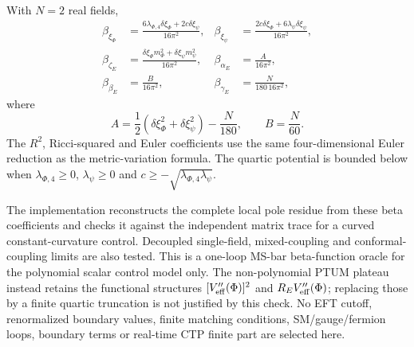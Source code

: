 \documentclass[epj]{svjour}
\begin{document}
With $N=2$ real fields,
\begin{align}
\beta_{\xi_\Phi}
&=\frac{6\lambda_{\Phi,4}\delta\xi_\Phi
+2c\delta\xi_\psi}{16\pi^2},
&
\beta_{\xi_\psi}
&=\frac{2c\delta\xi_\Phi
+6\lambda_\psi\delta\xi_\psi}{16\pi^2},
\nonumber\\
\beta_{\zeta_E}
&=\frac{\delta\xi_\Phi m_\Phi^2
+\delta\xi_\psi m_\psi^2}{16\pi^2},
&
\beta_{\alpha_E}
&=\frac{A}{16\pi^2},
\nonumber\\
\beta_{\beta_E}
&=\frac{B}{16\pi^2},
&
\beta_{\gamma_E}
&=\frac{N}{180\,16\pi^2},
\label{eq:ptum_scalar_quartic_beta_curvature}
\end{align}
where
\begin{equation}
A=\frac12(\delta\xi_\Phi^2+\delta\xi_\psi^2)-\frac{N}{180},
\qquad B=\frac{N}{60}.
\end{equation}
The $R^2$, Ricci-squared and Euler coefficients use the same
four-dimensional Euler reduction as the metric-variation formula.
The quartic potential is bounded below when
$\lambda_{\Phi,4}\ge0$, $\lambda_\psi\ge0$ and
$c\ge-\sqrt{\lambda_{\Phi,4}\lambda_\psi}$.

The implementation reconstructs the complete local pole residue from
these beta coefficients and checks it against the independent matrix
trace for a curved constant-curvature control. Decoupled single-field,
mixed-coupling and conformal-coupling limits are also tested. This is
a one-loop MS-bar beta-function oracle for the polynomial scalar
control model only. The non-polynomial PTUM plateau instead retains
the functional structures $[V_{\rm eff}''(\Phi)]^2$ and
$R_E V_{\rm eff}''(\Phi)$; replacing those by a finite quartic
truncation is not justified by this check. No EFT cutoff, renormalized
boundary values, finite matching conditions, SM/gauge/fermion loops,
boundary terms or real-time CTP finite part are selected here.
\end{document}
